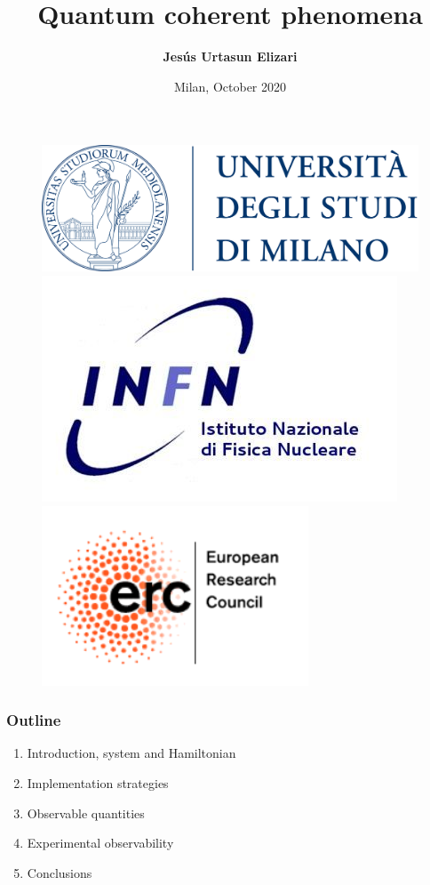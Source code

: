 \documentclass[aspectratio=43]{beamer}
\title[Quantum coherent phenomena]{Quantum coherent phenomena}
\author{\textbf {Jes\'us Urtasun Elizari}}
\date{Milan, October 2020}
\begin{document}
\begin{frame}

	\vspace{1.0 cm}
	
	
	\vspace{0.25 cm}

	\begin{figure}
		\includegraphics[width = 3.0 cm]{plots/logo_unimi.png}
		\hfill
		\includegraphics[width = 3.0 cm]{plots/logo_infn.png}
		\hfill
		\includegraphics[width = 3.0 cm]{plots/logo_erc.png}
		\endminipage
	\end{figure}

	\vspace{1.0 cm}

\end{frame}

\begin{frame}

	\frametitle{Outline}
	
	\begin{enumerate}
		\item {\color{blue}Introduction, system and Hamiltonian}
		\item {\color{blue}Implementation strategies}
		\item {\color{blue}Observable quantities}
		\item {\color{blue}Experimental observability}
		\item {\color{blue}Conclusions}
	\end{enumerate}
	
\end{frame}
\end{document}
